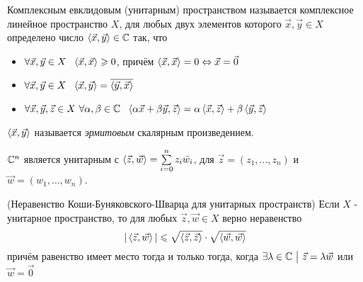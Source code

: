 \begin{definition}
	Комплексным евклидовым (унитарным) пространством называется комплексное линейное пространство $X$, для любых двух элементов которого $\vec{x}, \vec{y} \in X$ определено число $\left\langle\vec{x}, \vec{y}\right\rangle \in \mathbb{C}$ так, что
	\begin{itemize}
		\item $\forall \vec{x}, \vec{y} \in X\ \ \trbr{\vec{x}, \vec{x}} \ge 0$, причём $\left\langle\vec{x}, \vec{x}\right\rangle = 0 \Leftrightarrow \vec{x} = \vec{0}$
		
		\item $\forall \vec{x}, \vec{y} \in X\ \ \trbr{\vec{x}, \vec{y}} = \overline{\trbr{\vec{y}, \vec{x}}}$
		
		\item $\forall \vec{x}, \vec{y}, \vec{z} \in X\ \forall \alpha, \beta \in \mathbb{C}\ \ \left\langle\alpha\vec{x} + \beta\vec{y}, \vec{z}\right\rangle = \alpha\left\langle\vec{x}, \vec{z}\right\rangle + \beta\left\langle\vec{y}, \vec{z}\right\rangle$
	\end{itemize}
	$\left\langle\vec{x}, \vec{y}\right\rangle$ называется \textit{эрмитовым} скалярным произведением.
\end{definition}

\begin{lemma}
	$\mathbb{C}^n$ является унитарным с $\left\langle\vec{z}, \vec{w}\right\rangle = \sum\limits_{i = 0}^n z_i \bar{w_i}$, для $\vec{z} = (z_1, \ldots, z_n)$ и $\vec{w} = (w_1, \ldots, w_n)$.
\end{lemma}

\begin{theorem} (Неравенство Коши-Буняковского-Шварца для унитарных пространств)
	Если $X$ - унитарное пространство, то для любых $\vec{z}, \vec{w} \in X$ верно неравенство
	\[
		|\left\langle\vec{z}, \vec{w}\right\rangle| \leqslant \sqrt{\left\langle\vec{z}, \vec{z}\right\rangle} \cdot \sqrt{\left\langle\vec{w}, \vec{w}\right\rangle}
	\]
	причём равенство имеет место тогда и только тогда, когда $\exists \lambda \in \mathbb{C} \ \big|\  \vec{z} = \lambda\vec{w}$ или $\vec{w} = \vec{0}$
\end{theorem}

